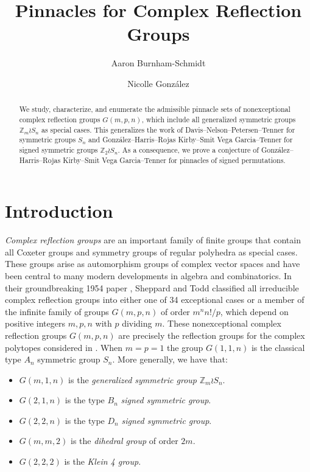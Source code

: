 \documentclass[12pt,reqno]{amsart}
\title{Pinnacles for Complex Reflection Groups}
\author{Aaron Burnham-Schmidt}
\author{Nicolle Gonz\'{a}lez}
\numberwithin{equation}{section}
\theoremstyle{plain}
\theoremstyle{definition}
\theoremstyle{remark}
\newcommand{\Z}{\mathbb{Z}}
\begin{document}
\begin{abstract}
We study, characterize, and enumerate the admissible pinnacle sets of nonexceptional complex reflection groups $G(m,p,n)$, which include all generalized symmetric groups $\Z_m \wr S_n$ as special cases. 
This generalizes the work of Davis--Nelson--Petersen--Tenner for symmetric groups $S_n$ and Gonz\'alez--Harris--Rojas Kirby--Smit Vega Garcia--Tenner for signed symmetric groups $\Z_2 \wr S_n$.
As a consequence, we prove a conjecture of Gonz\'alez--Harris--Rojas Kirby--Smit Vega Garcia--Tenner for pinnacles of signed permutations.
\end{abstract}

\maketitle 


\section{Introduction}
\emph{Complex reflection groups} are an important family of finite groups that contain all Coxeter groups and symmetry groups of regular polyhedra as special cases. These groups arise as automorphism groups of complex vector spaces and have been central to many modern developments in algebra and combinatorics. In their groundbreaking 1954 paper \cite{Shephard_Todd_1954}, Sheppard and Todd classified all irreducible complex reflection groups into either one of 34 exceptional cases or a member of the infinite family of groups $G(m,p,n)$ of order $m^n n!/p$, which depend on positive integers $m,p,n$ with $p$ dividing $m$. 
These nonexceptional complex reflection groups $G(m,p,n)$ are precisely the reflection groups for the complex polytopes considered in \cite[pg. 378]{Shep53}.
When $m=p=1$ the group $G(1,1,n)$ is the classical type $A_n$ symmetric group $S_n$. More generally, we have that:
\begin{itemize}
\item $G(m,1,n)$ is the \emph{generalized symmetric group} $\Z_m \wr S_n$.
\item $G(2,1,n)$ is the type $B_n$ \emph{signed symmetric group}.
\item $G(2,2,n)$ is the type $D_n$ \emph{signed symmetric group}.
\item $G(m,m,2)$ is the \emph{dihedral group} of order $2m$.
\item $G(2,2,2)$ is the \emph{Klein 4 group}.
\end{itemize}
\end{document}
